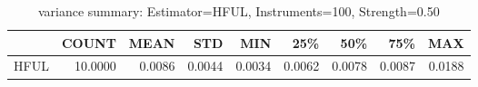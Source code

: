 \begin{table}[ht]
\centering
\caption{variance summary: Estimator=HFUL, Instruments=100, Strength=0.50}
\begin{tabular}{lrrrrrrrr}
\toprule
 & COUNT & MEAN & STD & MIN & 25\% & 50\% & 75\% & MAX \\
\midrule
HFUL & 10.0000 & 0.0086 & 0.0044 & 0.0034 & 0.0062 & 0.0078 & 0.0087 & 0.0188 \\
\bottomrule
\end{tabular}
\end{table}
